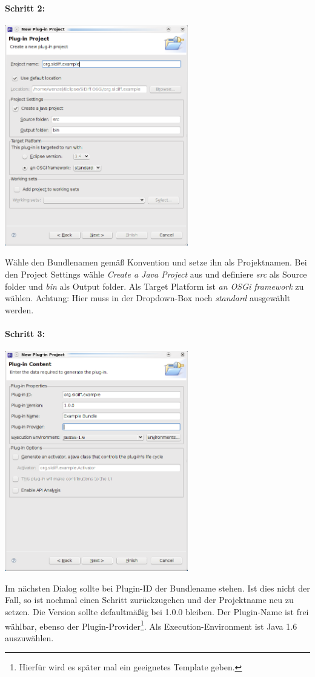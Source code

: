\documentclass[10pt,a4paper]{scrartcl}
\begin{document}
\paragraph{Schritt 2:}
\begin{center}
\includegraphics[width=8cm]{pics/newbundle2.png}
\end{center}
Wähle den Bundlenamen gemäß Konvention und setze ihn als Projektnamen. Bei den
Project Settings wähle \emph{Create a Java Project} aus und definiere \emph{src}
als Source folder und \emph{bin} als Output folder. Als Target Platform ist
\emph{an OSGi framework} zu wählen. Achtung: Hier muss in der Dropdown-Box noch
\emph{standard} ausgewählt werden.

\paragraph{Schritt 3:}
\begin{center}
\includegraphics[width=8cm]{pics/newbundle3.png}
\end{center}
Im nächsten Dialog sollte bei Plugin-ID der Bundlename stehen. Ist dies nicht
der Fall, so ist nochmal einen Schritt zurückzugehen und der Projektname neu zu
setzen. Die Version sollte defaultmäßig bei 1.0.0 bleiben. Der Plugin-Name ist
frei wählbar, ebenso der Plugin-Provider\footnote{Hierfür wird es später mal ein
geeignetes Template geben.}. Als Execution-Environment ist Java 1.6 auszuwählen.
\end{document}
